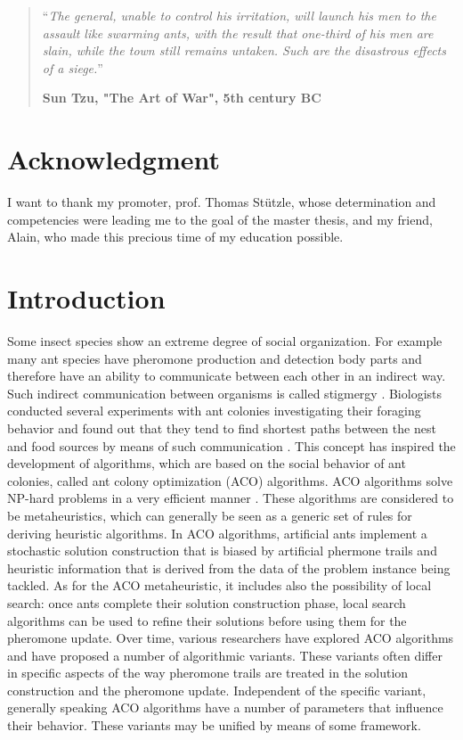 \documentclass[12pt,a4paper,oneside]{book}
\begin{document}
\medskip

\begin{quotation}
\noindent ``\emph{The general, unable to control his irritation, will launch his men
to the assault like swarming ants, with the result that one-third of
his men are slain, while the town still remains untaken. Such are
the disastrous effects of a siege.}''
\begin{flushright}\textbf{Sun Tzu, "The Art of War", 5th century BC}\end{flushright}
\end{quotation}
\chapter*{Acknowledgment}
\thispagestyle{empty} 

\noindent I want to thank my promoter, prof. Thomas St{\"u}tzle, whose determination and competencies were leading me to the goal of the master thesis, and my friend, Alain, who made this precious time of my education possible.

\thispagestyle{empty} 
\setcounter{page}{0}
\tableofcontents
\mainmatter 
\chapter{Introduction}
\setcounter{page}{1}
\vspace*{0.5cm}

Some insect species show an extreme degree of social organization. For example many ant species have pheromone production and detection body parts and therefore have an ability to communicate between each other in an indirect way. Such indirect communication between organisms is called stigmergy \cite{doi:10.1162/106454699568692}. Biologists conducted several experiments with ant colonies investigating their foraging behavior and found out that they tend to find shortest paths between the nest and food sources by means of such communication \cite{6174275}. This concept has inspired the development of algorithms, which are based on the social behavior of ant colonies, called ant colony optimization (ACO) algorithms. ACO algorithms solve NP-hard problems in a very efficient manner \cite{Dorigo1996}. These algorithms are considered to be metaheuristics, which can generally be seen as a generic set of rules for deriving heuristic algorithms. In ACO algorithms, artificial ants implement a stochastic solution construction that is biased by artificial phermone trails and heuristic information that is derived from the data of the problem instance being tackled. As for the ACO metaheuristic, it includes also the possibility of local search: once ants complete their solution construction phase, local search algorithms can be used to refine their solutions before using them for the pheromone update. Over time, various researchers have explored ACO algorithms and have proposed a number of algorithmic variants. These variants often differ in specific aspects of the way pheromone trails are treated in the solution construction and the pheromone update. Independent of the specific variant, generally speaking ACO algorithms have a number of parameters that influence their behavior. These variants may be unified by means of some framework.
\end{document}
